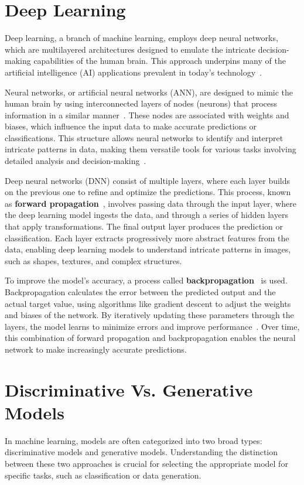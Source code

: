 \documentclass[12pt,DIV14,BCOR12mm,a4paper,footinclude=false,headinclude,parskip=half-,twoside,openright,cleardoublepage=empty,toc=index,bibliography=totoc,listof=totoc]{scrreprt}
\numberwithin{equation}{chapter}
\begin{document}
\section{Deep Learning}
Deep learning, a branch of machine learning, employs deep neural networks, which are multilayered architectures designed to emulate the intricate decision-making capabilities of the human brain. This approach underpins many of the artificial intelligence (AI) applications prevalent in today’s technology~\cite{wuttke2024}.

Neural networks, or artificial neural networks (ANN), are designed to mimic the human brain by using interconnected layers of nodes (neurons) that process information in a similar manner~\cite{maind2014research}. These nodes are associated with weights and biases, which influence the input data to make accurate predictions or classifications. This structure allows neural networks to identify and interpret intricate patterns in data, making them versatile tools for various tasks involving detailed analysis and decision-making~\cite{hardesty2017explained, maind2014research}.

Deep neural networks (DNN) consist of multiple layers, where each layer builds on the previous one to refine and optimize the predictions. This process, known as \textbf{forward propagation}~\cite{luhaniwal2019}, involves passing data through the input layer, where the deep learning model ingests the data, and through a series of hidden layers that apply transformations. The final output layer produces the prediction or classification. Each layer extracts progressively more abstract features from the data, enabling deep learning models to understand intricate patterns in images, such as shapes, textures, and complex structures.

To improve the model's accuracy, a process called \textbf{backpropagation}~\cite{lecun1988theoretical} is used. Backpropagation calculates the error between the predicted output and the actual target value, using algorithms like gradient descent to adjust the weights and biases of the network. By iteratively updating these parameters through the layers, the model learns to minimize errors and improve performance~\cite{rumelhart1986learning}. Over time, this combination of forward propagation and backpropagation enables the neural network to make increasingly accurate predictions.
\section{Discriminative Vs. Generative Models}
In machine learning, models are often categorized into two broad types: discriminative models and generative models. Understanding the distinction between these two approaches is crucial for selecting the appropriate model for specific tasks, such as classification or data generation.
\end{document}
